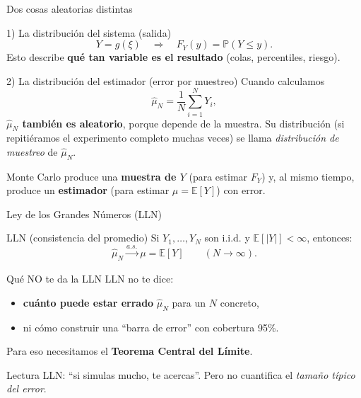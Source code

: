 \documentclass[aspectratio=1610, 9pt]{beamer}
\begin{document}
\begin{frame}{Dos cosas aleatorias distintas}
\begin{block}{1) La distribución del sistema (salida)}
\[
Y=g(\xi)\quad \Rightarrow \quad F_Y(y)=\mathbb P(Y\le y).
\]
Esto describe \textbf{qué tan variable es el resultado} (colas, percentiles, riesgo).
\end{block}

\begin{block}{2) La distribución del estimador (error por muestreo)}
Cuando calculamos
\[
\widehat\mu_N=\frac{1}{N}\sum_{i=1}^N Y_i,
\]
\textbf{$\widehat\mu_N$ también es aleatorio}, porque depende de la muestra.
Su distribución (si repitiéramos el experimento completo muchas veces) se llama
\emph{distribución de muestreo} de $\widehat\mu_N$.
\end{block}


Monte Carlo produce una \textbf{muestra de $Y$} (para estimar $F_Y$) y, al mismo tiempo,
produce un \textbf{estimador} (para estimar $\mu=\mathbb E[Y]$) con error.

\end{frame}

\begin{frame}{Ley de los Grandes Números (LLN)}
\begin{block}{LLN (consistencia del promedio)}
Si $Y_1,\dots,Y_N$ son i.i.d. y $\mathbb E[|Y|]<\infty$, entonces:
\[
\widehat\mu_N \xrightarrow[]{a.s.} \mu=\mathbb E[Y]\qquad (N\to\infty).
\]
\end{block}

\begin{block}{Qué NO te da la LLN}
LLN no te dice:
\begin{itemize}
  \item \textbf{cuánto puede estar errado} $\widehat\mu_N$ para un $N$ concreto,
  \item ni cómo construir una ``barra de error'' con cobertura 95\%.
\end{itemize}
Para eso necesitamos el \textbf{Teorema Central del Límite}.
\end{block}

\begin{alertblock}{Lectura}
LLN: ``si simulas mucho, te acercas''. \quad Pero no cuantifica el \emph{tamaño típico del error}.
\end{alertblock}
\end{frame}
\end{document}
